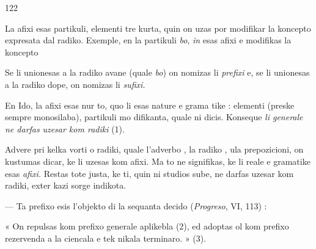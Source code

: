 \begin{VUpage}[126]{122}

\VUsaut{4.43mm}

La afixi esas partikuli, elementi tre kurta, quin on uzas\nl
por modifikar la koncepto expresata dal radiko. Exemple,\nl
en  la partikuli \textit{bo}, \textit{in} esas afixi e modifikas la\nl
koncepto 

Se li unionesas a la radiko avane (quale \textit{bo}) on nomizas\nl
li \textit{prefixi} e, se li unionesas a la radiko dope, on nomizas\nl
li \textit{sufixi.}

En Ido, la afixi esas nur to, quo li esas nature e grama\cc
tike : elementi (preske sempre monosilaba), partikuli mo\cc
difikanta, quale ni dicis. Konseque \textit{li generale ne darfas}\nl
\textit{uzesar kom radiki} (1).

Advere pri kelka vorti o radiki, quale l'adverbo , la\nl
radiko , ula prepozicioni, on kustumas dicar, ke li uzesas\nl
kom afixi. Ma to ne signifikas, ke li reale e gramatike esas\nl
\textit{afixi.} Restas tote justa, ke ti, quin ni studios sube, ne darfas\nl
uzesar kom radiki, exter kazi sorge indikota.

\VUsaut{6.93mm}
\VUsaut{4.49mm}

 --- Ta prefixo esis l'objekto di la sequanta decido (\textit{Progreso}, VI, 113) :

« On repulsas  kom prefixo generale aplikebla (2),\nl
ed adoptas ol kom prefixo rezervenda a la ciencala e tek\cc
nikala terminaro. » (3).
\end{VUpage}

